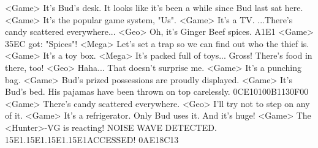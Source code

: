<Game> It's Bud's desk. 
It looks like it's been a while since Bud last sat here. 
<Game> It's the popular game system, "Us". 
<Game> It's a TV. 
...There's candy scattered everywhere... 
<Geo> Oh, it's Ginger Beef spices. 
{A1}{E1} 
<Game> {35}{EC} got: "Spices"! 
<Mega> Let's set a trap so we can find out who the thief is. 
<Game> It's a toy box. 
<Mega> It's packed full of toys... 
Gross! There's food in there, too! 
<Geo> Haha... That doesn't surprise me. 
<Game> It's a punching bag. 
<Game> Bud's prized possessions are proudly displayed. 
<Game> It's Bud's bed. 
His pajamas have been thrown on top carelessly. 
{0C}{E1}{01}{00}{B1}{13}{0F}{00}
<Game> There's candy scattered everywhere. 
<Geo> I'll try not to step on any of it. 
<Game> It's a refrigerator. 
Only Bud uses it. And it's huge! 
<Game> The <Hunter>-VG is reacting! 
NOISE WAVE DETECTED. {15}{E1}.{15}{E1}.{15}{E1}.{15}{E1}ACCESSED! 
{0A}{E1}{8C}{13}

